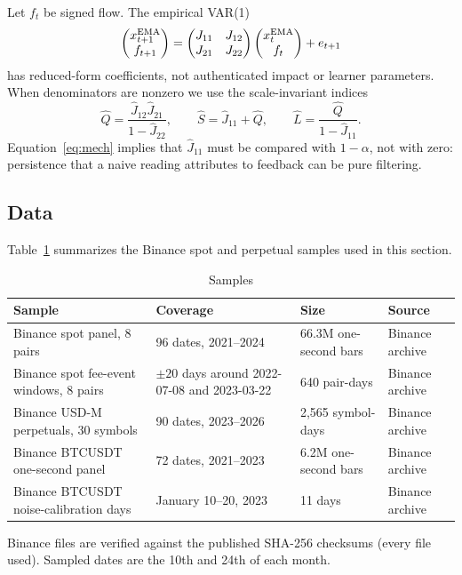 Let $f_t$ be signed flow. The empirical VAR(1)
\begin{equation}\label{eq:var}
\begin{pmatrix}x^{\rm EMA}_{t+1}\\ f_{t+1}\end{pmatrix}=\begin{pmatrix}J_{11}&J_{12}\\ J_{21}&J_{22}\end{pmatrix}\begin{pmatrix}x^{\rm EMA}_t\\ f_t\end{pmatrix}+e_{t+1}
\end{equation}
has reduced-form coefficients, not authenticated impact or learner parameters. When denominators are nonzero we use the scale-invariant indices
\begin{equation}\label{eq:QS}
\hat Q=\frac{\hat J_{12}\hat J_{21}}{1-\hat J_{22}},\qquad\hat S=\hat J_{11}+\hat Q,\qquad\hat L=\frac{\hat Q}{1-\hat J_{11}} .
\end{equation}
Equation~\eqref{eq:mech} implies that $\hat J_{11}$ must be compared with $1-\alpha$, not with zero: persistence that a naive reading attributes to feedback can be pure filtering.

\subsection{Data}

Table~\ref{tab:samples} summarizes the Binance spot and perpetual samples used in this section.

\begin{table}[t]\centering\small
\begin{threeparttable}
\caption{Samples}\label{tab:samples}
\begin{tabular}{p{}p{}p{}l}
\toprule
Sample & Coverage & Size & Source\\
\midrule
Binance spot panel, 8 pairs & 96 dates, 2021--2024 & 66.3M one-second bars & Binance archive\\
Binance spot fee-event windows, 8 pairs & $\pm20$ days around 2022-07-08 and 2023-03-22 & 640 pair-days & Binance archive\\
Binance USD-M perpetuals, 30 symbols & 90 dates, 2023--2026 & 2{,}565 symbol-days & Binance archive\\
Binance BTCUSDT one-second panel & 72 dates, 2021--2023 & 6.2M one-second bars & Binance archive\\
Binance BTCUSDT noise-calibration days & January 10--20, 2023 & 11 days & Binance archive\\
\bottomrule
\end{tabular}
\begin{tablenotes}\footnotesize\item Binance files are verified against the published SHA-256 checksums (every file used). Sampled dates are the 10th and 24th of each month.\end{tablenotes}
\end{threeparttable}
\end{table}

